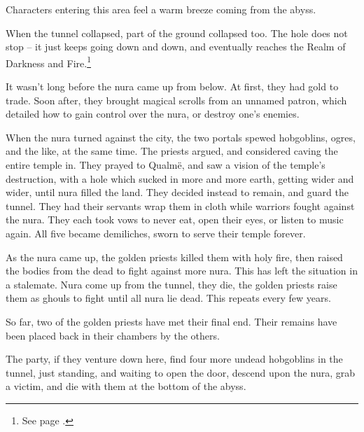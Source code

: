 \begin{multicols}{2}


Characters entering this area feel a warm breeze coming from the abyss.

\begin{exampletext}

When the tunnel collapsed, part of the ground collapsed too.  The hole does not stop -- it just keeps going down and down, and eventually reaches the Realm of Darkness and Fire.\footnote{See page \pageref{darknessandfire}.}

It wasn't long before the nura came up from below.  At first, they had gold to trade.  Soon after, they brought magical scrolls from an unnamed patron, which detailed how to gain control over the nura, or destroy one's enemies.

When the nura turned against the city, the two portals spewed hobgoblins, ogres, and the like, at the same time.
The priests argued, and considered caving the entire temple in.
They prayed to Qualm\"{e}, and saw a vision of the temple's destruction, with a hole which sucked in more and more earth, getting wider and wider, until nura filled the land.
They decided instead to remain, and guard the tunnel.
They had their servants wrap them in cloth while warriors fought against the nura.
They each took vows to never eat, open their eyes, or listen to music again.
All five became demiliches, sworn to serve their temple forever.

As the nura came up, the golden priests killed them with holy fire, then raised the bodies from the dead to fight against more nura.  This has left the situation in a stalemate.  Nura come up from the tunnel, they die, the golden priests raise them as ghouls to fight until all nura lie dead.  This repeats every few years.

So far, two of the golden priests have met their final end.  Their remains have been placed back in their chambers by the others.

\end{exampletext}


The party, if they venture down here, find four more undead hobgoblins in the tunnel, just standing, and waiting to open the door, descend upon the nura, grab a victim, and die with them at the bottom of the abyss.

\begin{exampletext}


\end{exampletext}
\end{multicols}
